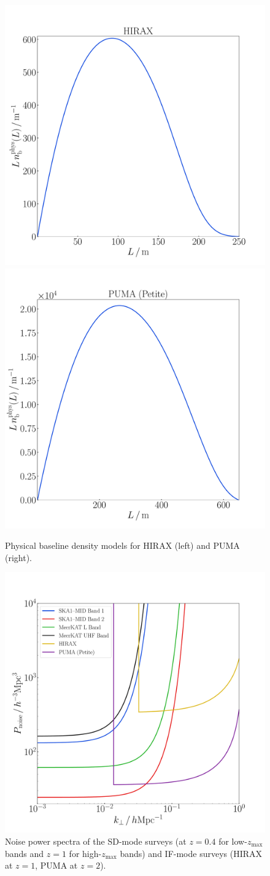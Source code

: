 {%
\begin{figure}[ht]
\centering
\includegraphics[width=.49\textwidth]{fig/nbHIRAX}
\includegraphics[width=.49\textwidth]{fig/nbPUMAPetite}
\vspace*{-0.5cm}
\caption{Physical baseline density models for HIRAX (left) and PUMA (right).}\label{nbphys}
\end{figure}
\begin{figure}[!ht]
\centering
\includegraphics[width=.49\textwidth]{fig/Pnoise}
\vspace*{-0.5cm}
\caption{{Noise power spectra of the SD-mode surveys (at $z=0.4$ for low-$z_\mathrm{max}$ bands and $z=1$ for high-$z_\mathrm{max}$ bands) and IF-mode surveys (HIRAX at $z=1$, PUMA at $z=2$).}}\label{pnoise}
\end{figure}

}
